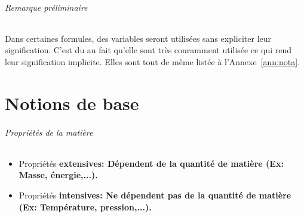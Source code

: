 

\usepackage{multirow}
\usepackage[version=3]{mhchem}
\usepackage{color}
\usepackage{chemfig}
\usepackage{tikz}
\usepackage{pgfplots}
\usepackage{pgffor}

\renewcommand{\textbf}[1]{\begingroup\bfseries\mathversion{bold}#1\endgroup}

\newcommand\sorb{\mathrm{s}}
\newcommand\porb{\mathrm{p}}
\newcommand\dorb{\mathrm{d}}
\newcommand\forb{\mathrm{f}}
\newcommand\gorb{\mathrm{g}}
\newcommand\gaz{\ensuremath{_{(g)}}}
\newcommand\solid{\ensuremath{_{(s)}}}
\newcommand\liquid{\ensuremath{_{(l)}}}
\newcommand\debye{\mathrm{D}}
\newcommand\calo{\mathrm{cal}}
\newcommand\atm{\mathrm{atm}}
\newcommand\ccal{\ensuremath{C_\mathrm{cal}}}
\newcommand\qrev{\ensuremath{q_{\mathrm{rév}}}}
\newcommand\kc{\ensuremath{K_{\mathrm{c}}}}
\newcommand\kp{\ensuremath{K_{\mathrm{p}}}}
\newcommand\keq{\ensuremath{K_{\mathrm{éq}}}}
\newcommand\pkb{\mathrm{p}\ensuremath{K_b}}
\newcommand\pka{\mathrm{p}\ensuremath{K_a}}
\newcommand\ph{\ensuremath{\mathrm{pH}}}


\paragraph{Remarque préliminaire}
Dans certaines formules,
des variables seront utilisées sans expliciter leur signification.
C'est du au fait qu'elle sont très couramment utilisée
ce qui rend leur signification implicite.
Elles sont tout de même listée à l'Annexe~\ref{ann:nota}.

\part{Notions de base}

\paragraph{Propriétés de la matière}
\begin{itemize}
	\item Propriétés \textbf{extensives}: Dépendent de la quantité de matière (Ex: Masse, énergie,...).
	\item Propriétés \textbf{intensives}: Ne dépendent pas de la quantité de matière (Ex: Température, pression,...).
\end{itemize}


